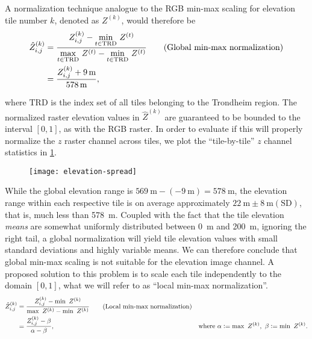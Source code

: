 A normalization technique analogue to the RGB min-max scaling for elevation tile number $k$, denoted as $Z^{(k)}$, would therefore be
\begin{align*}
  \hat{Z}_{i,j}^{(k)}
  &=
  \frac{%
    Z_{i,j}^{(k)} - \underset{t \in \mathrm{TRD}}{\min}~Z^{(t)}
  }{%
    \underset{t \in \mathrm{TRD}}{\max}~Z^{(t)} - \underset{t \in \mathrm{TRD}}{\min}~Z^{(t)}
  }
  \tag{Global min-max normalization}
  \\
  &=
  \frac{%
    Z_{i,j}^{(k)} + \SI{9}{\meter}
  }{%
    \SI{578}{\meter}
  },%
\end{align*}

where $\mathrm{TRD}$ is the index set of all tiles belonging to the Trondheim region.
The normalized raster elevation values in $\hat{Z}^{(k)}$ are guaranteed to be bounded to the interval $[0, 1]$, as with the RGB raster.
In order to evaluate if this will properly normalize the $z$ raster channel across tiles, we plot the \enquote{tile-by-tile} $z$ channel statistics in \cref{fig:elevation-spread}.

\begin{figure}[H]
  \centering
  \texttt{[image: elevation-spread]}
  \label{fig:elevation-spread}
\end{figure}

While the global elevation range is $\SI{569}{\meter} - (\SI{-9}{\meter}) = \SI{578}{\meter}$, the elevation range within each respective tile is on average approximately $\SI{22}{\meter} \pm \SI{8}{\meter} (\mathrm{SD})$, that is, much less than \SI{578}{\meter}.
Coupled with the fact that the tile elevation \textit{means} are somewhat uniformly distributed between \SI{0}{\meter} and \SI{200}{\meter}, ignoring the right tail, a global normalization will yield tile elevation values with small standard deviations and highly variable means.
We can therefore conclude that global min-max scaling is not suitable for the elevation image channel.
A proposed solution to this problem is to scale each tile independently to the domain $[0, 1]$, what we will refer to as \enquote{local min-max normalization}.
%
\begin{align*}
  \hat{Z}_{i,j}^{(k)}
  &=
  \frac{%
    Z_{i,j}^{(k)} - \min~Z^{(k)}
  }{%
    \max~Z^{(k)} - \min~Z^{(k)}
  }%
  \tag{Local min-max normalization} %
  \\
  &=
  \frac{%
    Z_{i,j}^{(k)} - \beta
  }{%
    \alpha - \beta
  },%
  &\text{where }\alpha \defeq \max~Z^{(k)},~\beta \defeq \min~Z^{(k)}.
\end{align*}

